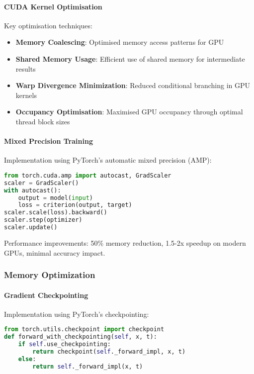 \paragraph{CUDA Kernel Optimisation}
Key optimisation techniques:
\begin{itemize}
    \item \textbf{Memory Coalescing}: Optimised memory access patterns for GPU
    \item \textbf{Shared Memory Usage}: Efficient use of shared memory for intermediate results
    \item \textbf{Warp Divergence Minimization}: Reduced conditional branching in GPU kernels
    \item \textbf{Occupancy Optimisation}: Maximised GPU occupancy through optimal thread block sizes
\end{itemize}

\paragraph{Mixed Precision Training}
Implementation using PyTorch's automatic mixed precision (AMP):

\begin{lstlisting}[language=python, caption=Mixed Precision Training]
from torch.cuda.amp import autocast, GradScaler
scaler = GradScaler()
with autocast():
    output = model(input)
    loss = criterion(output, target)
scaler.scale(loss).backward()
scaler.step(optimizer)
scaler.update()
\end{lstlisting}

Performance improvements: 50\% memory reduction, 1.5-2x speedup on modern GPUs, minimal accuracy impact.

\subsubsection{Memory Optimization}

\paragraph{Gradient Checkpointing}
Implementation using PyTorch's checkpointing:

\begin{lstlisting}[language=python, caption=Gradient Checkpointing]
from torch.utils.checkpoint import checkpoint
def forward_with_checkpointing(self, x, t):
    if self.use_checkpointing:
        return checkpoint(self._forward_impl, x, t)
    else:
        return self._forward_impl(x, t)
\end{lstlisting}

